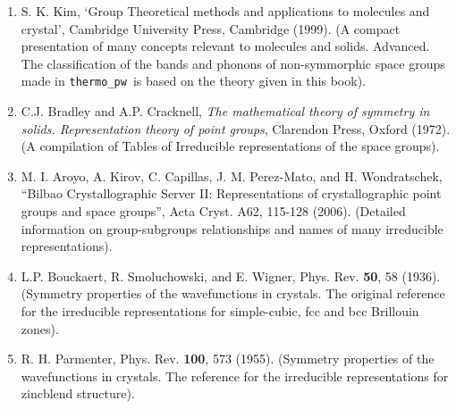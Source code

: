 \documentclass[12pt,a4paper]{article}
\def\thermo{\texttt{thermo\_pw}}
\begin{document}
\begin{enumerate}
\item
S. K. Kim, `Group Theoretical methods and applications to molecules and 
crystal',
Cambridge University Press, Cambridge (1999). 
(A compact presentation of many concepts relevant to molecules and solids.
Advanced. The classification of the bands and phonons of non-symmorphic space groups
made in \thermo\ is based on the theory given in this book).

\item
C.J. Bradley and A.P. Cracknell, {\it The mathematical
theory of symmetry in solids. Representation theory of point groups},
Clarendon Press, Oxford (1972). (A compilation of Tables of Irreducible 
representations of the space groups).

\item
M. I. Aroyo, A. Kirov, C. Capillas, J. M. Perez-Mato, and H. Wondratschek,
``Bilbao Crystallographic Server II: Representations of crystallographic 
point groups and space groups'', Acta Cryst. A62, 115-128 (2006).
(Detailed information on group-subgroups relationships and names
of many irreducible representations).

\item
L.P. Bouckaert, R. Smoluchowski, and E. Wigner, Phys. Rev. {\bf 50}, 58 (1936).
(Symmetry properties of the wavefunctions in crystals. The original reference
for the irreducible representations for simple-cubic, fcc and bcc
Brillouin zones).

\item
R. H. Parmenter, Phys. Rev. {\bf 100}, 573 (1955).
(Symmetry properties of the wavefunctions in crystals. The reference
for the irreducible representations for zincblend structure).

\end{enumerate}
\end{document}
